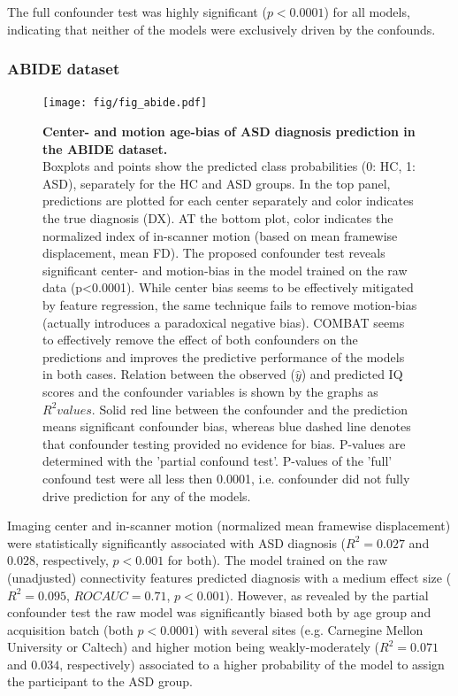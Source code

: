 \documentclass{article}
\begin{document}
The full confounder test was highly significant ($p<0.0001$) for all models, indicating that neither of the models were exclusively driven by the confounds.

\subsubsection*{ABIDE dataset}

\begin{figure}[!b]
  \centering
  \texttt{[image: fig/fig\_abide.pdf]}
  \caption{\textbf{Center- and motion age-bias of ASD diagnosis prediction in the ABIDE dataset.} \\
  Boxplots and points show the predicted class probabilities (0: HC, 1: ASD), separately for the HC and ASD groups. In the top panel, predictions are plotted for each center separately and color indicates the true diagnosis (DX). AT the bottom plot, color indicates the normalized index of in-scanner motion (based on mean framewise displacement, mean FD). The proposed confounder test reveals significant center- and motion-bias in the model trained on the raw data (p<0.0001). While center bias seems to be effectively mitigated by feature regression, the same technique fails to remove motion-bias (actually introduces a paradoxical negative bias). COMBAT seems to effectively remove the effect of both confounders on the predictions and improves the predictive performance of the models in both cases.
  Relation between the observed ($\hat{y}$) and predicted IQ scores and the confounder variables is shown by the graphs as $R^2 values$. Solid red line between the confounder and the prediction means significant confounder bias, whereas blue dashed line denotes that confounder testing provided no evidence for bias. P-values are determined with the 'partial confound test'. P-values of the 'full' confound test were all less then 0.0001, i.e. confounder did not fully drive prediction for any of the models.
  }
  \label{fig:abide}
\end{figure}

Imaging center and in-scanner motion (normalized mean framewise displacement) were statistically significantly associated with ASD diagnosis ($R^2=0.027$ and $0.028$, respectively, $p<0.001$ for both). The model trained on the raw (unadjusted) connectivity features predicted diagnosis with a medium effect size ($R^2=0.095$, $ROC AUC = 0.71$, $p<0.001$).
However, as revealed by the partial confounder test the raw model was significantly biased both by age group and acquisition batch (both $p<0.0001$) with several sites (e.g. Carnegine Mellon University or Caltech) and higher motion being weakly-moderately ($R^2=0.071$ and $0.034$, respectively) associated to a higher probability of the model to assign the participant to the ASD group.
\end{document}

